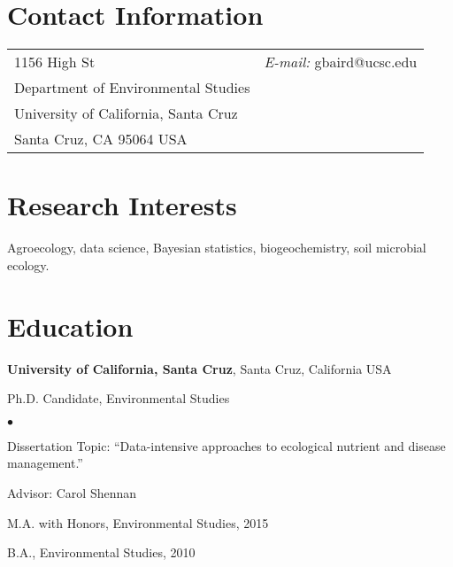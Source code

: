 \documentclass{res}
\newenvironment{list1}{
	\begin{list}{\ding{113}}{%
			\setlength{\itemsep}{0in}
			\setlength{\parsep}{0in} \setlength{\parskip}{0in}
			\setlength{\topsep}{0in} \setlength{\partopsep}{0in} 
			\setlength{\leftmargin}{0.17in}}}{\end{list}}
\newenvironment{list2}{
	\begin{list}{$\bullet$}{%
			\setlength{\itemsep}{0in}
			\setlength{\parsep}{0in} \setlength{\parskip}{0in}
			\setlength{\topsep}{0in} \setlength{\partopsep}{0in} 
			\setlength{\leftmargin}{0.2in}}}{\end{list}}
\begin{document}
	
	
	
	\begin{resume}
		\section{\sc Contact Information}
		\vspace{.05in}
		\begin{tabular}{@{}p{3in}p{4in}}
			1156 High St            &  {\it E-mail:}  gbaird@ucsc.edu \\            
			Department of Environmental Studies    \\         
			University of California, Santa Cruz &\\       
			Santa Cruz, CA 95064 USA  &  \\     
		\end{tabular}
		
		
		\section{\sc Research Interests}
		Agroecology, data science, Bayesian statistics, biogeochemistry, soil microbial ecology.		
		\section{\sc Education}
		{\bf University of California, Santa Cruz}, Santa Cruz, California USA\\
		\vspace*{-.1in}
		\begin{list1}
			\item[] Ph.D. Candidate, Environmental Studies 
			\begin{list2}
				\vspace*{.05in}
				\item Dissertation Topic:  ``Data-intensive approaches to 
				  ecological nutrient and disease management.'' 
				\item Advisor:  Carol Shennan
			\end{list2}
			\vspace*{.05in}
			\item[] M.A. with Honors, Environmental Studies, 2015
			\vspace*{.05in}
			\item[] B.A., Environmental Studies, 2010
		\end{list1}
		

\end{resume}
\end{document}
